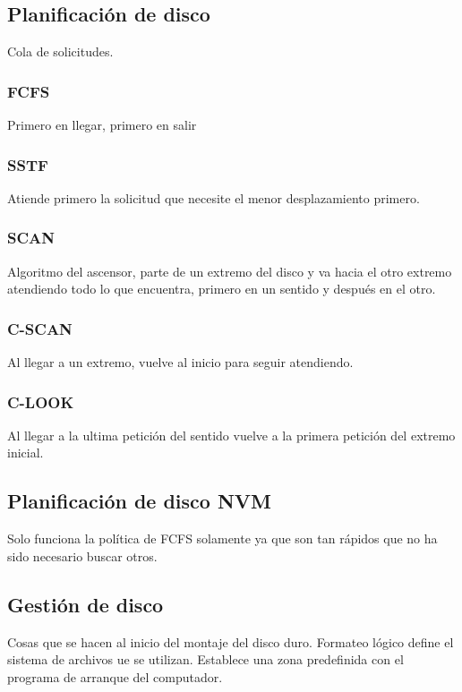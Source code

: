 \documentclass{templateNote}
\begin{document}
\subsection*{Planificación de disco}
Cola de solicitudes.

\subsubsection*{FCFS}
Primero en llegar, primero en salir

\subsubsection*{SSTF}
Atiende primero la solicitud que necesite el menor desplazamiento primero.

\subsubsection*{SCAN}
Algoritmo del ascensor, parte de un extremo del disco y va hacia el otro extremo atendiendo todo lo que encuentra, primero en un sentido y después en el otro.

\subsubsection*{C-SCAN}
Al llegar a un extremo, vuelve al inicio para seguir atendiendo.

\subsubsection*{C-LOOK}
Al llegar a la ultima petición del sentido vuelve a la primera petición del extremo inicial.

\subsection*{Planificación de disco NVM}
Solo funciona la política de FCFS solamente ya que son tan rápidos que no ha sido necesario buscar otros.

\subsection*{Gestión de disco}
Cosas que se hacen al inicio del montaje del disco duro. 
Formateo lógico define el sistema de archivos ue se utilizan.
Establece una zona predefinida con el programa de arranque del computador.
\end{document}
